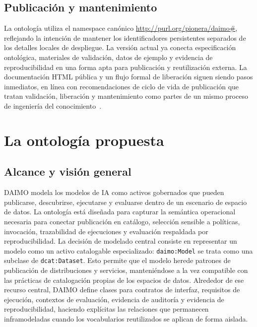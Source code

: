 \documentclass[11pt,a4paper]{article}
\newcommand{\code}[1]{\texttt{#1}}
\begin{document}
\subsection{Publicación y mantenimiento}

La ontología utiliza el namespace canónico \url{http://purl.org/pionera/daimo#}, reflejando la intención de mantener los identificadores persistentes separados de los detalles locales de despliegue. La versión actual ya conecta especificación ontológica, materiales de validación, datos de ejemplo y evidencia de reproducibilidad en una forma apta para publicación y reutilización externa. La documentación HTML pública y un flujo formal de liberación siguen siendo pasos inmediatos, en línea con recomendaciones de ciclo de vida de publicación que tratan validación, liberación y mantenimiento como partes de un mismo proceso de ingeniería del conocimiento~\cite{penteado23,schmidt21}.

\section{La ontología propuesta}\label{sec:ontology}

\subsection{Alcance y visión general}

DAIMO modela los modelos de IA como activos gobernados que pueden publicarse, descubrirse, ejecutarse y evaluarse dentro de un escenario de espacio de datos. La ontología está diseñada para capturar la semántica operacional necesaria para conectar publicación en catálogo, selección sensible a políticas, invocación, trazabilidad de ejecuciones y evaluación respaldada por reproducibilidad. La decisión de modelado central consiste en representar un modelo como un activo catalogable especializado: \code{daimo:Model} se trata como una subclase de \code{dcat:Dataset}. Esto permite que el modelo herede patrones de publicación de distribuciones y servicios, manteniéndose a la vez compatible con las prácticas de catalogación propias de los espacios de datos. Alrededor de ese recurso central, DAIMO define clases para contratos de interfaz, requisitos de ejecución, contextos de evaluación, evidencia de auditoría y evidencia de reproducibilidad, haciendo explícitas las relaciones que permanecen inframodeladas cuando los vocabularios reutilizados se aplican de forma aislada.
\end{document}
